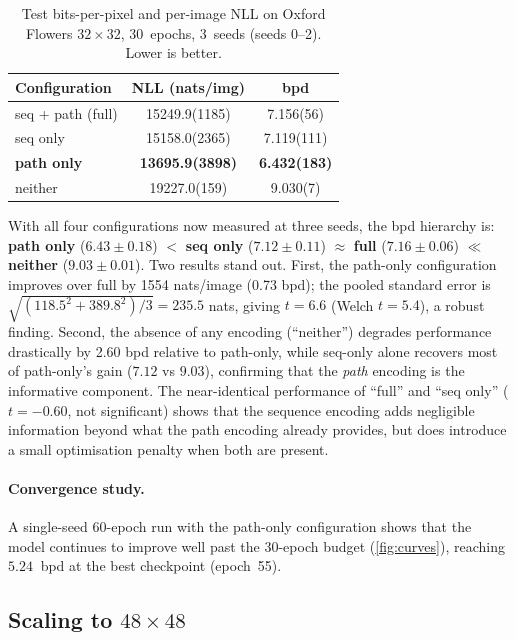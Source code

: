 \documentclass[conference,a4paper]{IEEEtran}
\begin{document}
\begin{table}[t]
\centering
\caption{Test bits-per-pixel and per-image NLL on Oxford Flowers
$32\times32$, 30~epochs, 3~seeds (seeds 0--2). Lower is better.}
\label{tab:main}
\begin{tabular}{l S[table-format=5.1(4)] S[table-format=1.3(3)]}
\toprule
Configuration & {NLL (nats/img)} & {bpd} \\
\midrule
seq + path (full)    & 15249.9(1185) & 7.156(56)  \\
seq only             & 15158.0(2365) & 7.119(111) \\
\textbf{path only}   & \bfseries 13695.9(3898) & \bfseries 6.432(183) \\
neither              & 19227.0(159)  & 9.030(7)   \\
\bottomrule
\end{tabular}
\end{table}

With all four configurations now measured at three seeds, the
bpd hierarchy is: \textbf{path only} ($6.43 \pm 0.18$)
$<$ \textbf{seq only} ($7.12 \pm 0.11$)
$\approx$ \textbf{full} ($7.16 \pm 0.06$)
$\ll$ \textbf{neither} ($9.03 \pm 0.01$).
Two results stand out. First, the path-only configuration improves
over full by \num{1554} nats/image (\SI{0.73}{} bpd); the pooled
standard error is $\sqrt{(118.5^2+389.8^2)/3}=\num{235.5}$ nats,
giving $t=\num{6.6}$ (Welch $t=\num{5.4}$), a robust finding.
Second, the absence of any encoding (``neither'') degrades
performance drastically by \SI{2.60}{} bpd relative to path-only,
while seq-only alone recovers most of path-only's gain ($7.12$ vs
$9.03$), confirming that the \emph{path} encoding is the
informative component. The near-identical performance of ``full''
and ``seq only'' ($t=-0.60$, not significant) shows that the
sequence encoding adds negligible information beyond what the
path encoding already provides, but does
introduce a small optimisation penalty when both are present.

\paragraph{Convergence study.}
A single-seed 60-epoch run with the path-only configuration shows
that the model continues to improve well past the 30-epoch budget
(\cref{fig:curves}), reaching $\SI{5.24}{}$ bpd at the best
checkpoint (epoch~55).



\subsection{Scaling to $48\times48$}\label{ssec:scale}
\end{document}
